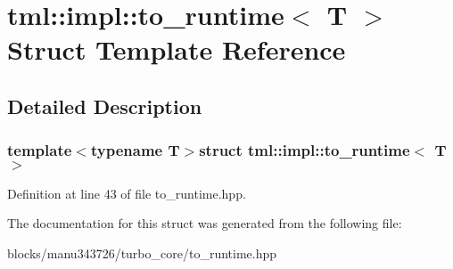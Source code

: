 \hypertarget{structtml_1_1impl_1_1to__runtime}{\section{tml\+:\+:impl\+:\+:to\+\_\+runtime$<$ T $>$ Struct Template Reference}
\label{structtml_1_1impl_1_1to__runtime}
}


\subsection{Detailed Description}
\subsubsection*{template$<$typename T$>$struct tml\+::impl\+::to\+\_\+runtime$<$ T $>$}



Definition at line 43 of file to\+\_\+runtime.\+hpp.



The documentation for this struct was generated from the following file\+:\begin{DoxyCompactItemize}
\item 
blocks/manu343726/turbo\+\_\+core/to\+\_\+runtime.\+hpp\end{DoxyCompactItemize}
